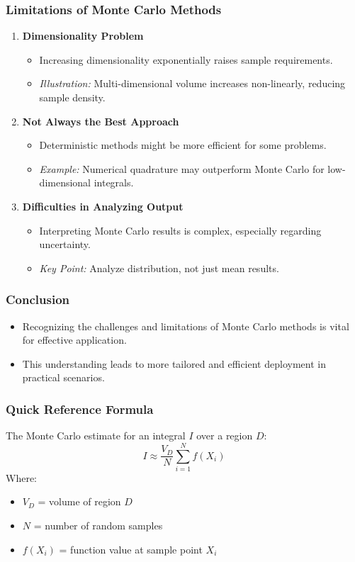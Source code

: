\documentclass[aspectratio=169]{beamer}
\begin{document}
\begin{frame}[fragile]
    \frametitle{Limitations of Monte Carlo Methods}
    \begin{enumerate}
        \item \textbf{Dimensionality Problem}
            \begin{itemize}
                \item Increasing dimensionality exponentially raises sample requirements.
                \item \emph{Illustration:} Multi-dimensional volume increases non-linearly, reducing sample density.
            \end{itemize}
        \item \textbf{Not Always the Best Approach}
            \begin{itemize}
                \item Deterministic methods might be more efficient for some problems.
                \item \emph{Example:} Numerical quadrature may outperform Monte Carlo for low-dimensional integrals.
            \end{itemize}
        \item \textbf{Difficulties in Analyzing Output}
            \begin{itemize}
                \item Interpreting Monte Carlo results is complex, especially regarding uncertainty.
                \item \emph{Key Point:} Analyze distribution, not just mean results.
            \end{itemize}
    \end{enumerate}
\end{frame}

\begin{frame}[fragile]
    \frametitle{Conclusion}
    \begin{itemize}
        \item Recognizing the challenges and limitations of Monte Carlo methods is vital for effective application.
        \item This understanding leads to more tailored and efficient deployment in practical scenarios.
    \end{itemize}
\end{frame}

\begin{frame}[fragile]
    \frametitle{Quick Reference Formula}
    The Monte Carlo estimate for an integral \( I \) over a region \( D \):
    \begin{equation}
        I \approx \frac{V_D}{N} \sum_{i=1}^{N} f(X_i)
    \end{equation}
    Where:
    \begin{itemize}
        \item \( V_D \) = volume of region \( D \)
        \item \( N \) = number of random samples
        \item \( f(X_i) \) = function value at sample point \( X_i \)
    \end{itemize}
\end{frame}
\end{document}
